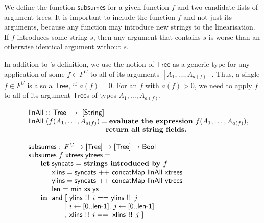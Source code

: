We define the function $\textsf{subsumes}$ for a given function $f$
and two candidate lists of argument trees. It is important to include
the function $f$ and not just its arguments, because any \gf{}
function may introduce new strings to the linearisation. If $f$
introduces some string $s$, then any argument that contains $s$ is
worse than an otherwise identical argument without $s$.

In addition to \citet{angelov2010phd}'s definition, we use the notion of
$\textsf{Tree}$ as a generic type for any application of some
$f \in F^C$ to all of its arguments $[A_1, \dots, A_{a(f)}]$.  Thus, a
single $f \in F^C$ is also a $\textsf{Tree}$, if $a(f) = 0$. For an
$f$ with $a(f) > 0$, we need to apply $f$ to all of its argument
$\textsf{Tree}$s of types $A_1, \ldots, A_{a(f)}$.


\begin{figure}[h]
\begin{EmptyItem}
$\begin{array}{p{0.25cm} p{0.2cm} p{0.3cm} p{1.65cm} l}
\multicolumn{5}{l}{\textsf{linAll :: Tree } \rightarrow \textsf{ [String]}} \\
\multicolumn{5}{l}{\textsf{linAll }(f(A_1,\ldots,A_{a(f)}) = \textbf{evaluate the expression } f (A_1,\ldots,A_{a(f)}),} \\
             &          &             &                     & \textbf{return all string fields.} \\
\\
\multicolumn{5}{l}{\textsf{subsumes : }F^C \rightarrow \textsf{[Tree]} \rightarrow \textsf{[Tree]} \rightarrow \textsf{Bool}} \\
\multicolumn{5}{l}{\textsf{subsumes } f \textsf{ xtrees ytrees} =} \\
 & \textbf{let} & \multicolumn{3}{l}{\textsf{syncats = } \textbf{strings introduced by } f} \\
 &              & \multicolumn{3}{l}{\textsf{xlins} = \textsf{syncats} \text{ ++ } \textsf{concatMap linAll
                  xtrees}} \\
 &              & \multicolumn{3}{l}{\textsf{ylins} =  \textsf{syncats} \text{ ++ } \textsf{concatMap linAll
                  ytrees}} \\
 &              & \multicolumn{3}{l}{\textsf{len = min xs ys}} \\
 & \textbf{in}  & \multicolumn{3}{l}{\textsf{and [ ylins !! } i  \text{ ==} \textsf{ ylins !! } j} \\
 &              &  & \multicolumn{2}{l}{\textsf{| } i \leftarrow \textsf{[0..len-1], } j \leftarrow \textsf{[0..len-1]}} \\
 &              &  & \multicolumn{2}{l}{\textsf{, xlins !! } i == \textsf{ xlins !! } j \textsf{ ]}} \\
\end{array}$
\end{EmptyItem}
\end{figure}

